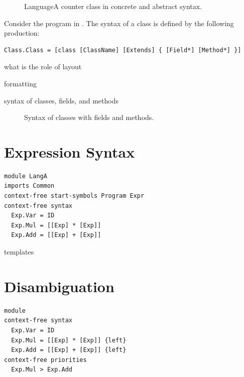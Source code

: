 \begin{figure}[t]\small


\caption{LanguageA counter class in concrete and abstract syntax.}
\end{figure}

Consider the  program in .
The syntax of a class is defined by the following production:

\begin{lstlisting}[language=SDF]
  Class.Class = [class [ClassName] [Extends] { [Field*] [Method*] }]  
\end{lstlisting}

what is the role of layout

formatting


syntax of classes, fields, and methods 





\begin{figure}

\caption{Syntax of classes with fields and methods.}
\end{figure}


\section{Expression Syntax}


\begin{lstlisting}[language=SDF]
module LangA
imports Common
context-free start-symbols Program Expr
context-free syntax
  Exp.Var = ID
  Exp.Mul = [[Exp] * [Exp]]
  Exp.Add = [[Exp] + [Exp]]
\end{lstlisting}

templates \cite{VollebregtKV12}


\section{Disambiguation}

\begin{lstlisting}
module 
context-free syntax
  Exp.Var = ID
  Exp.Mul = [[Exp] * [Exp]] {left}
  Exp.Add = [[Exp] + [Exp]] {left}
context-free priorities
  Exp.Mul > Exp.Add
\end{lstlisting}

